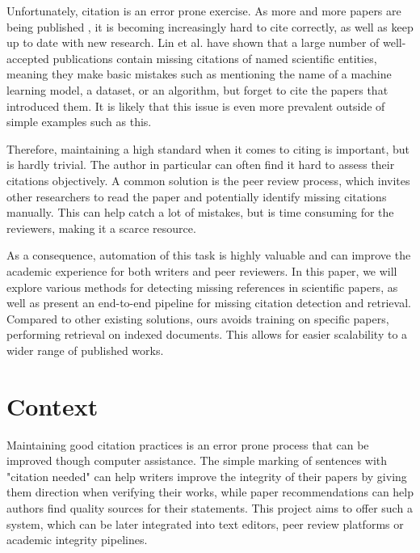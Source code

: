\documentclass[12pt,a4paper]{report}
\begin{document}
Unfortunately, citation is an error prone exercise. As more and more papers are being published \cite{increasing-yearly-publications}, it is becoming increasingly hard to cite correctly, as well as keep up to date with new research. Lin et al. \cite{Lin2022DetectingAA} have shown that a large number of well-accepted publications contain missing citations of named scientific entities, meaning they make basic mistakes such as mentioning the name of a machine learning model, a dataset, or an algorithm, but forget to cite the papers that introduced them. It is likely that this issue is even more prevalent outside of simple examples such as this.

Therefore, maintaining a high standard when it comes to citing is important, but is hardly trivial. The author in particular can often find it hard to assess their citations objectively. A common solution is the peer review process, which invites other researchers to read the paper and potentially identify missing citations manually. This can help catch a lot of mistakes, but is time consuming for the reviewers, making it a scarce resource.

As a consequence, automation of this task is highly valuable and can improve the academic experience for both writers and peer reviewers. In this paper, we will explore various methods for detecting missing references in scientific papers, as well as present an end-to-end pipeline for missing citation detection and retrieval. Compared to other existing solutions, ours avoids training on specific papers, performing retrieval on indexed documents. This allows for easier scalability to a wider range of published works.

\section{Context}

Maintaining good citation practices is an error prone process that can be improved though computer assistance. The simple marking of sentences with "citation needed" can help writers improve the integrity of their papers by giving them direction when verifying their works, while paper recommendations can help authors find quality sources for their statements. This project aims to offer such a system, which can be later integrated into text editors, peer review platforms or academic integrity pipelines.
\end{document}

